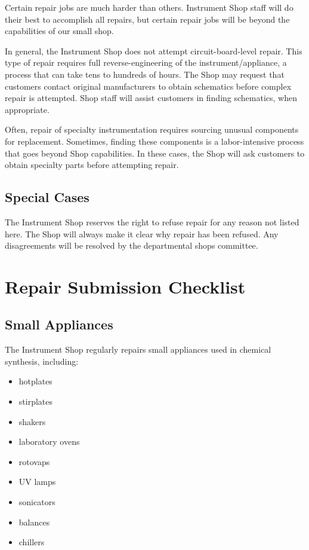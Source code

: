 \documentclass{training}
\begin{document}
Certain repair jobs are much harder than others.
Instrument Shop staff will do their best to accomplish all repairs, but certain repair jobs will be beyond the capabilities of our small shop.

In general, the Instrument Shop does not attempt circuit-board-level repair.
This type of repair requires full reverse-engineering of the instrument/appliance, a process that can take tens to hundreds of hours.
The Shop may request that customers contact original manufacturers to obtain schematics before complex repair is attempted.
Shop staff will assist customers in finding schematics, when appropriate.

Often, repair of specialty instrumentation requires sourcing unusual components for replacement. Sometimes, finding these components is a labor-intensive process that goes beyond Shop capabilities.
In these cases, the Shop will ask customers to obtain specialty parts before attempting repair.

\subsection{Special Cases}

The Instrument Shop reserves the right to refuse repair for any reason not listed here.
The Shop will always make it clear why repair has been refused.
Any disagreements will be resolved by the departmental shops committee.

\clearpage
\section{Repair Submission Checklist}

\subsection{Small Appliances}

The Instrument Shop regularly repairs small appliances used in chemical synthesis, including:

\begin{multicols}{3}
\begin{itemize}
  \item hotplates
  \item stirplates
  \item shakers
  \item laboratory ovens
  \item rotovaps
  \item UV lamps
  \item sonicators
  \item balances
  \item chillers
\end{itemize}
\end{multicols}
\end{document}
